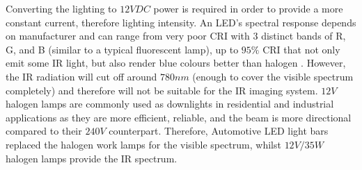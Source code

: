 \documentclass[fleqn,twoside,12pt]{report}
\begin{document}
Converting the lighting to $12VDC$ power is required in order to provide a more constant current, therefore lighting intensity. An LED's spectral response depends on manufacturer and can range from very poor CRI with 3 distinct bands of R, G, and B (similar to a typical fluorescent lamp), up to $95\%$ CRI that not only emit some IR light, but also render blue colours better than halogen \cite{lumicrest}. However, the IR radiation will cut off around $780nm$ (enough to cover the visible spectrum completely) and therefore will not be suitable for the IR imaging system. $12V$ halogen lamps are commonly used as downlights in residential and industrial applications as they are more efficient, reliable, and the beam is more directional compared to their $240V$ counterpart. Therefore, Automotive LED light bars replaced the halogen work lamps for the visible spectrum, whilst $12V/35W$ halogen lamps provide the IR spectrum. 
\end{document}
